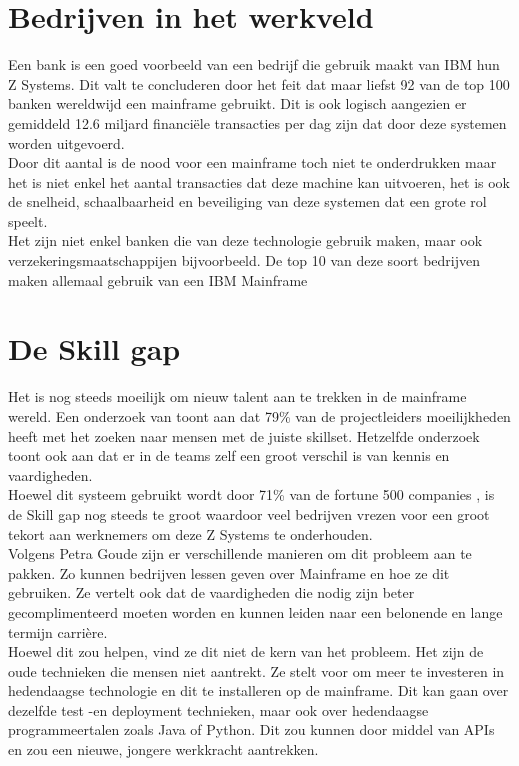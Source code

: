\section{Bedrijven in het werkveld}
\label{sec:bedrijven-in-werkveld}
Een bank is een goed voorbeeld van een bedrijf die gebruik maakt van IBM hun Z Systems. Dit valt te concluderen door het feit dat maar liefst 92 van de top 100 banken wereldwijd een mainframe gebruikt. Dit is ook logisch aangezien er gemiddeld 12.6 miljard financiële transacties per dag zijn dat door deze systemen worden uitgevoerd. \autocite{Wagle2017} \\
Door dit aantal is de nood voor een mainframe toch niet te onderdrukken maar het is niet enkel het aantal transacties dat deze machine kan uitvoeren, het is ook de snelheid, schaalbaarheid en beveiliging van deze systemen dat een grote rol speelt. \\
Het zijn niet enkel banken die van deze technologie gebruik maken, maar ook  verzekeringsmaatschappijen bijvoorbeeld. De top 10 van deze soort bedrijven maken allemaal gebruik van een IBM Mainframe \autocite{Tozzi2022}

\section{De Skill gap}
\label{sec:skill-gap}
Het is nog steeds moeilijk om nieuw talent aan te trekken in de mainframe wereld. Een onderzoek van  \textcite{Deloitte2020} 
toont aan dat 79\% van de projectleiders moeilijkheden heeft met het zoeken naar mensen met de juiste skillset. Hetzelfde onderzoek toont ook aan dat er in de teams zelf een groot verschil is van kennis en vaardigheden.  \\ Hoewel dit systeem gebruikt wordt door 71\% van de fortune 500 companies \autocite{Tozzi2022} , is de Skill gap nog steeds te groot waardoor veel bedrijven vrezen voor een groot tekort aan werknemers om deze Z Systems te onderhouden.
\\
Volgens Petra Goude zijn er verschillende manieren om dit probleem aan te pakken. Zo kunnen bedrijven lessen geven over Mainframe en hoe ze dit gebruiken. Ze vertelt ook dat de vaardigheden die nodig zijn beter gecomplimenteerd moeten worden en kunnen leiden naar een belonende en lange termijn carrière. \\ Hoewel dit zou helpen, vind ze dit niet de kern van het probleem. Het zijn de oude technieken die mensen niet aantrekt. Ze stelt voor om meer te investeren in hedendaagse technologie en dit te installeren op de mainframe. Dit kan gaan over dezelfde test -en deployment technieken, maar ook over hedendaagse programmeertalen zoals Java of Python. Dit zou kunnen door middel van APIs en zou een nieuwe, jongere werkkracht aantrekken. \autocite{Goude2023}


